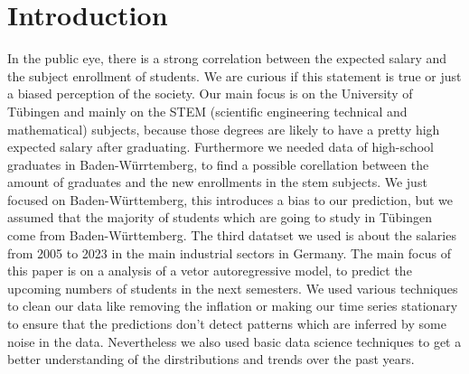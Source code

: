 \documentclass{article}
\theoremstyle{plain}
\theoremstyle{definition}
\theoremstyle{remark}
\begin{document}
\section{Introduction}\label{sec:intro}
In the public eye, there is a strong correlation between the expected salary and the subject enrollment of students. We are curious if this statement is true or just a biased
perception of the society. Our main focus is on the University of Tübingen and mainly on the STEM (scientific engineering technical and mathematical) subjects, because those degrees 
are likely to have a pretty high expected salary after graduating. Furthermore we needed data of high-school graduates in Baden-Würrtemberg, to find a possible corellation between
the amount of graduates and the new enrollments in the stem subjects. We just focused on Baden-Württemberg, this introduces a bias to our prediction, but we assumed that the 
majority of students which are going to study in Tübingen come from Baden-Württemberg. The third datatset we used is about the salaries from 2005 to 2023 in the main 
industrial sectors in Germany. The main focus of this paper is on a analysis of a vetor autoregressive model, to predict the upcoming numbers of students in the next semesters. We
used various techniques to clean our data like removing the inflation or making our time series stationary to ensure that the predictions don't detect patterns which are inferred by 
some noise in the data. Nevertheless we also used basic data science techniques to get a better understanding of the dirstributions and trends over the past years.

\end{document}
